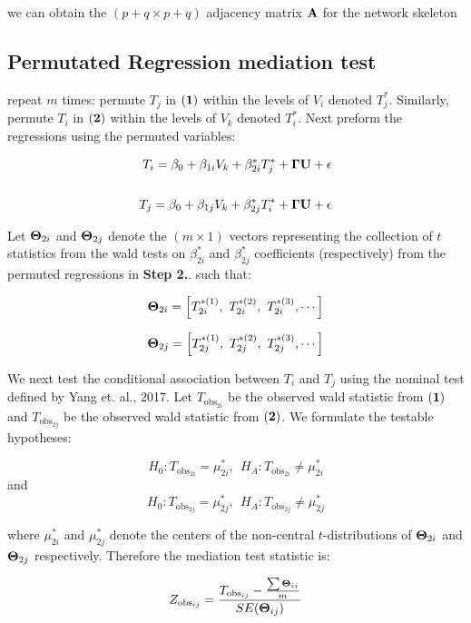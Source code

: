 \documentclass[12pt]{report}
\begin{document}
we can obtain the $(p+q \times p+q)$ adjacency matrix $\bf A$ for the network skeleton\\

\subsection*{Permutated Regression mediation test}
 repeat $m$ times: permute $T_j$ in $\bf (1)$ within the levels of $V_i$ denoted $T_j^{\ast}$. Similarly, permute $T_i$ in $\bf (2)$ within the levels of $V_k$ denoted $T_i^{\ast}$. Next preform the regressions using the permuted variables:

\begin{eqnarray}
T_i = \beta_0 +\beta_{1i}V_k+\beta_{2i}^{\ast}T_j^{\ast}+{\bf \Gamma U}+ \epsilon \\
\nonumber\\
T_j = \beta_0 +\beta_{1j}V_k+\beta_{2j}^{\ast}T_i^{\ast}+{\bf \Gamma U}+ \epsilon \nonumber 
\end{eqnarray}

 Let ${\bf \Theta}_{2i}$ and ${\bf \Theta}_{2j}$ denote the $(m \times 1)$ vectors representing the collection of $t$ statistics from the wald tests on $\beta_{2i}^{\ast}$ and $\beta_{2j}^{\ast}$ coefficients (respectively) from the permuted regressions in \textbf{Step 2.}. such that:

\[ {\bf \Theta}_{2i} = \left[ T_{2i}^{\ast (1)}, \ T_{2i}^{\ast (2)}, \ T_{2i}^{\ast (3)}, \cdots \right] \]

\[ {\bf \Theta}_{2j} = \left[ T_{2j}^{\ast (1)}, \ T_{2j}^{\ast (2)}, \ T_{2j}^{\ast (3)}, \cdots \right]  \]

We next test the conditional association between $T_i$ and $T_j$ using the nominal test defined by Yang et. al., 2017. Let $T_{\text{obs}_{2i}}$ be the observed wald statistic from $\bf (1)$ and $T_{\text{obs}_{2j}}$ be the observed wald statistic from $\bf(2)$. We formulate the testable hypotheses: 

\[ H_0: T_{\text{obs}_{2i}} = \mu_{2i}^{\ast}, \ \ H_A: T_{\text{obs}_{2i}} \neq \mu_{2i}^{\ast} \]
and
\[ H_0: T_{\text{obs}_{2j}} = \mu_{2j}^{\ast}, \ \ H_A: T_{\text{obs}_{2j}} \neq \mu_{2j}^{\ast} \]

where $\mu_{2i}^{\ast}$ and $\mu_{2j}^{\ast}$ denote the centers of the non-central $t$-distributions of ${\bf \Theta}_{2i}$ and ${\bf \Theta}_{2j}$ respectively. Therefore the mediation test statistic is:

\[ Z_{\text{obs}_{ij}} = \frac{T_{\text{obs}_{ij}} - \frac{\sum {\bf \Theta}_{ij}}{m} }{SE({\bf \Theta}_{ij})} \]
\end{document}

